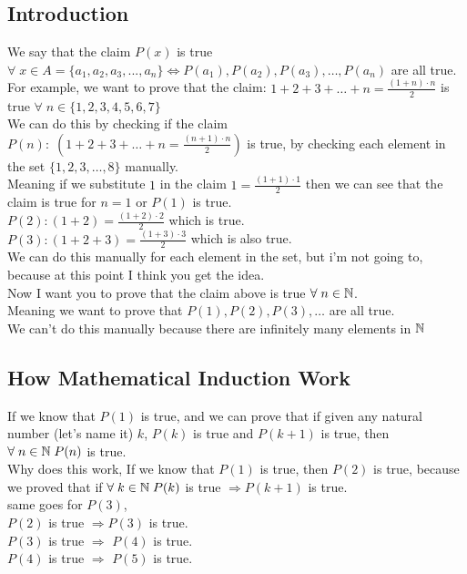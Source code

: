 \subsection{Introduction}
We say that the claim $P(x)$ is true $\forall\; x\in A = \{a_1,a_2,a_3,...,a_n\} \iff P(a_1), P(a_2), P(a_3),\ldots, P(a_n)$ are all true.\\
For example, we want to prove that the claim: $1+2+3+\ldots+n = \frac{(1+n)\cdot n}{2}$ is true $\forall\; n\in \{1,2,3,4,5,6,7\}$\\
We can do this by checking if the claim $P(n):\; (1+2+3+\ldots+n = \frac{(n+1)\cdot n}{2})$ is true, by checking each element in the set $\{1,2,3,\ldots,8\}$ manually.\\
Meaning if we substitute $1$ in the claim $1 = \frac{(1+1)\cdot 1}{2}$ then we can see that the claim is true for $n = 1$ or $P(1)$ is true.\\
$P(2): (1+2) = \frac{(1+2)\cdot 2}{2}$ which is true.\\
$P(3): (1+2+3) = \frac{(1+3)\cdot 3}{2}$ which is also true.\\
We can do this manually for each element in the set, but i'm not going to, because at this point I think you get the idea.\\
Now I want you to prove that the claim above is true $\forall\; n\in \mathbb{N}$.\\
Meaning we want to prove that $P(1),P(2),P(3),\ldots$ are all true.\\
We can't do this manually because there are infinitely many elements in $\mathbb{N}$\\



\subsection{How Mathematical Induction Work}
If we know that $P(1)$ is true, and we can prove that if given any natural number (let's name it) $k$, $P(k)$ is true and $P(k+1)$ is true, then $\forall \; n\in \mathbb{N}\; P(n)$ is true.\\
Why does this work, If we know that $P(1)$ is true, then $P(2)$ is true, because we proved that if $\forall\; k\in \mathbb{N}\; P(k)$ is true $\Longrightarrow P(k+1)$ is true.\\
same goes for $P(3)$,\\
$P(2)$ is true $\Longrightarrow P(3)$ is true.\\
$P(3)$ is true $\Longrightarrow$ $P(4)$ is true.\\
$P(4)$ is true $\Longrightarrow$ $P(5)$ is true.\\

